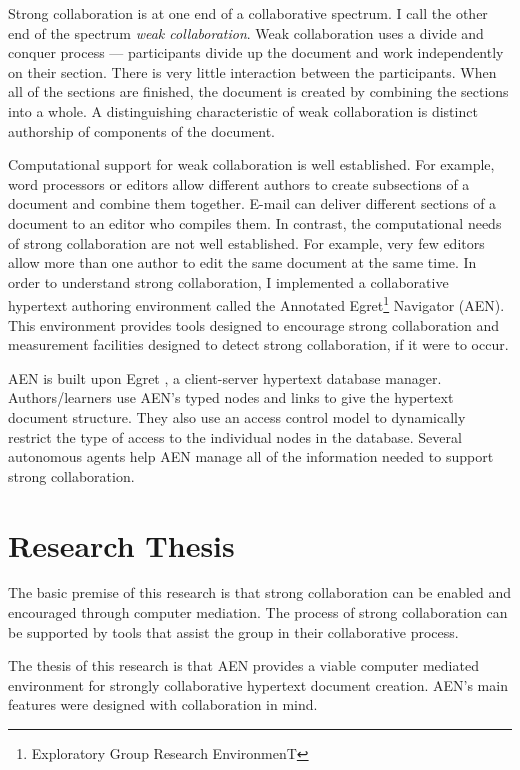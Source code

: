 Strong collaboration is at one end of a collaborative spectrum.  I call
the other end of the spectrum {\em weak collaboration}.  Weak collaboration
uses a divide and conquer process --- participants divide up the document
and work independently on their section.  There is very little interaction
between the participants.  When all of the sections are finished, the
document is created by combining the sections into a whole.  A
distinguishing characteristic of weak collaboration is distinct authorship
of components of the document.  

Computational support for weak collaboration is well established.  For
example, word processors or editors allow different authors to create
subsections of a document and combine them together.  E-mail can deliver
different sections of a document to an editor who compiles them.  In
contrast, the computational needs of strong collaboration are not well
established.  For example, very few editors allow more than one author to
edit the same document at the same time.  In order to understand strong
collaboration, I implemented a collaborative hypertext authoring
environment called the Annotated Egret\footnote{Exploratory Group Research
EnvironmenT} Navigator (AEN).  This environment provides tools designed to
encourage strong collaboration and measurement facilities designed to
detect strong collaboration, if it were to occur.

AEN is built upon Egret \cite{csdl-93-09}, a client-server hypertext
database manager.  Authors/learners use AEN's typed nodes and links to give
the hypertext document structure.  They also use an access control model to
dynamically restrict the type of access to the individual nodes in the
database.  Several autonomous agents help AEN manage all of the information
needed to support strong collaboration.

\section{Research Thesis}

The basic premise of this research is that strong collaboration can be
enabled and encouraged through computer mediation.  The process of strong
collaboration can be supported by tools that assist the group in their
collaborative process.

The thesis of this research is that AEN provides a viable computer mediated
environment for strongly collaborative hypertext document creation.  AEN's
main features were designed with collaboration in mind.


